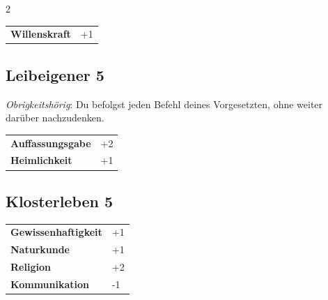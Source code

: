 \begin{multicols}{2}
\begin{tcolorbox}
\begin{tabular}{@{}ll@{}}
    \textbf{Willenskraft} & +1\\
\end{tabular}


\end{tcolorbox}

\begin{tcolorbox}
    \subsection*{Leibeigener \hfill \small{5 }}
    \tcblower
\textit{Obrigkeitshörig}: Du befolgst jeden Befehl deines Vorgesetzten, ohne weiter darüber nachzudenken.


\vspace{3mm}

\begin{tabular}{@{}ll@{}}
    \textbf{Auffassungsgabe} & +2\\
    \textbf{Heimlichkeit} & +1\\
\end{tabular}


\end{tcolorbox}

\begin{tcolorbox}
    \subsection*{Klosterleben \hfill \small{5 }}
    \tcblower




\begin{tabular}{@{}ll@{}}
    \textbf{Gewissenhaftigkeit} & +1\\
    \textbf{Naturkunde} & +1\\
    \textbf{Religion} & +2\\
    \textbf{Kommunikation} & -1\\
\end{tabular}



\end{tcolorbox}
\end{multicols}
